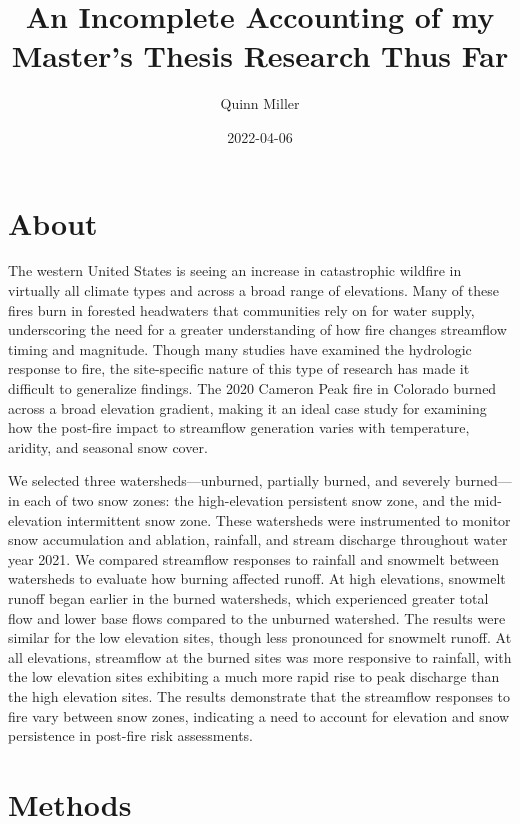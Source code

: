 \documentclass[
]{book}
\title{An Incomplete Accounting of my Master's Thesis Research Thus Far}
\author{Quinn Miller}
\date{2022-04-06}
\begin{document}
\maketitle

{
\setcounter{tocdepth}{1}
\tableofcontents
}
\hypertarget{about}{%
\chapter{About}\label{about}}

The western United States is seeing an increase in catastrophic wildfire in virtually all climate types and across a broad range of elevations. Many of these fires burn in forested headwaters that communities rely on for water supply, underscoring the need for a greater understanding of how fire changes streamflow timing and magnitude. Though many studies have examined the hydrologic response to fire, the site-specific nature of this type of research has made it difficult to generalize findings. The 2020 Cameron Peak fire in Colorado burned across a broad elevation gradient, making it an ideal case study for examining how the post-fire impact to streamflow generation varies with temperature, aridity, and seasonal snow cover.

We selected three watersheds---unburned, partially burned, and severely burned---in each of two snow zones: the high-elevation persistent snow zone, and the mid-elevation intermittent snow zone. These watersheds were instrumented to monitor snow accumulation and ablation, rainfall, and stream discharge throughout water year 2021. We compared streamflow responses to rainfall and snowmelt between watersheds to evaluate how burning affected runoff. At high elevations, snowmelt runoff began earlier in the burned watersheds, which experienced greater total flow and lower base flows compared to the unburned watershed. The results were similar for the low elevation sites, though less pronounced for snowmelt runoff. At all elevations, streamflow at the burned sites was more responsive to rainfall, with the low elevation sites exhibiting a much more rapid rise to peak discharge than the high elevation sites. The results demonstrate that the streamflow responses to fire vary between snow zones, indicating a need to account for elevation and snow persistence in post-fire risk assessments.

\hypertarget{methods}{%
\chapter{Methods}\label{methods}}
\end{document}
